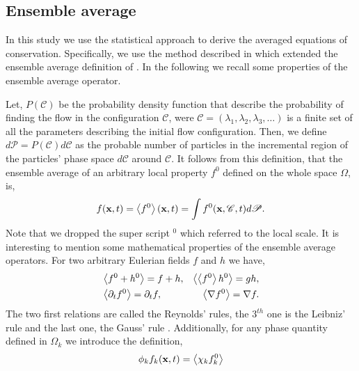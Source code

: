 
\subsection{Ensemble average}
In this study we use the statistical approach to derive the averaged equations of conservation. 
Specifically, we use the method described in \citet{zhang2021ensemble} which extended the ensemble average definition of \citet{batchelor1972sedimentation}. 
In the following we recall some properties of the ensemble average operator. 

Let, $P(\mathscr{C})$ be the probability density function that describe the probability of finding the flow in the configuration $\mathscr{C}$, were $\mathscr{C} = (\lambda_1,\lambda_2,\lambda_3,\ldots)$ is a finite set of all the parameters describing the initial flow configuration. 
Then, we define $d\mathscr{P} = P(\mathscr{C})d\mathscr{C}$ as the probable number of particles in the incremental region of the particles' phase space $d\mathscr{C}$ around $\mathscr{C}$. 
It follows from this definition, that the ensemble average of an arbitrary local property $f^0$ defined on the whole space $\Omega$, is,
\begin{equation}
    f(\textbf{x},t)
    = \left<f^0\right>(\textbf{x},t)
    =\int f^0(\textbf{x},\mathscr{C},t) d\mathscr{P}. 
    \label{eq:avg}
\end{equation}  
Note that we dropped the super script $^0$ which referred to the local scale. 
It is interesting to mention some mathematical properties of the ensemble average operators. 
For two arbitrary Eulerian fields $f$ and $h$ we have,
\begin{align}
    &\left<f^0+h^0\right> = f+h, 
    &\left<\left<f^0\right>h^0\right> = gh, \nonumber \\
    &\left<\partial_t f^0\right> 
    = \partial_t f, 
    &\left<\mathbf{\nabla} f^0\right>
    = \mathbf{\nabla} f. 
    \label{eq:avg_properties}
\end{align}
The two first relations are called the Reynolds' rules, the $3^{th}$ one is the Leibniz' 
rule and the last one, the Gauss' rule \citep{drew1983mathematical}.
Additionally, for any phase quantity defined in $\Omega_k$ we introduce the definition, 
\begin{equation}
    \phi_k f_k (\textbf{x},t) = \left<\chi_k f_k^0\right>
    \label{eq:1_avg}
\end{equation}
